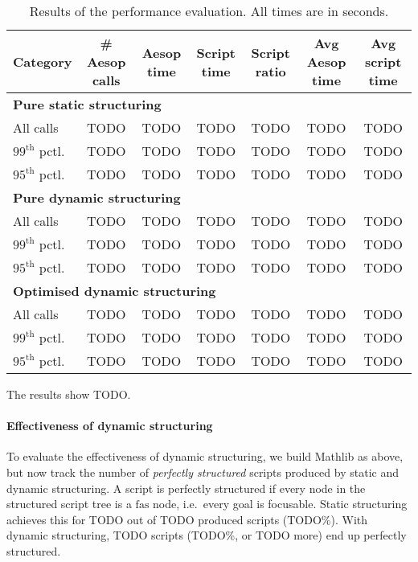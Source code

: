 \documentclass[sigplan,10pt,anonymous,review]{acmart}
\begin{document}
\begin{table*}
  \centering
  \begin{tabular}{lcccccc}
    \textbf{Category} & \textbf{\# Aesop calls} & \textbf{Aesop time} & \textbf{Script time} & \textbf{Script ratio} & \textbf{Avg Aesop time} & \textbf{Avg script time} \\
    \midrule
    \multicolumn{7}{l}{\textbf{Pure static structuring}} \\
    All calls               & TODO & TODO & TODO & TODO & TODO & TODO \\
    $99^{\mathrm{th}}$ pctl. & TODO & TODO & TODO & TODO & TODO & TODO \\
    $95^{\mathrm{th}}$ pctl. & TODO & TODO & TODO & TODO & TODO & TODO \\
    \midrule
    \multicolumn{7}{l}{\textbf{Pure dynamic structuring}} \\
    All calls               & TODO & TODO & TODO & TODO & TODO & TODO \\
    $99^{\mathrm{th}}$ pctl. & TODO & TODO & TODO & TODO & TODO & TODO \\
    $95^{\mathrm{th}}$ pctl. & TODO & TODO & TODO & TODO & TODO & TODO \\
    \midrule
    \multicolumn{7}{l}{\textbf{Optimised dynamic structuring}} \\
    All calls               & TODO & TODO & TODO & TODO & TODO & TODO \\
    $99^{\mathrm{th}}$ pctl. & TODO & TODO & TODO & TODO & TODO & TODO \\
    $95^{\mathrm{th}}$ pctl. & TODO & TODO & TODO & TODO & TODO & TODO \\
  \end{tabular}
  \medskip
  \caption{Results of the performance evaluation. All times are in seconds.}%
  \label{table:evaluation}
\end{table*}

The results show TODO.

\paragraph{Effectiveness of dynamic structuring}
To evaluate the effectiveness of dynamic structuring, we build Mathlib as above, but now track the number of \emph{perfectly structured} scripts produced by static and dynamic structuring.
A script is perfectly structured if every node in the structured script tree is a $\mathrm{fas}$ node, i.e.\ every goal is focusable.
Static structuring achieves this for TODO out of TODO produced scripts (TODO\%).
With dynamic structuring, TODO scripts (TODO\%, or TODO more) end up perfectly structured.
\end{document}
